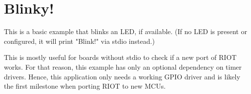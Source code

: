 \chapter{Blinky!}
\hypertarget{md__2home_2mj_2Desktop_2IoT-Chat-Digitalization_2blinky_2README}{}\label{md__2home_2mj_2Desktop_2IoT-Chat-Digitalization_2blinky_2README}
This is a basic example that blinks an LED, if available. (If no LED is present or configured, it will print "{}\+Blink!"{} via stdio instead.)

This is mostly useful for boards without stdio to check if a new port of RIOT works. For that reason, this example has only an optional dependency on timer drivers. Hence, this application only needs a working GPIO driver and is likely the first milestone when porting RIOT to new MCUs. 